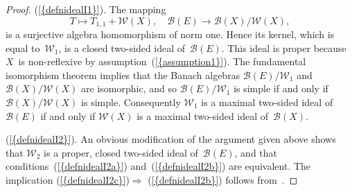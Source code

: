 \documentclass[12pt]{amsart}
\theoremstyle{definition}
\numberwithin{equation}{section}
\begin{document}
\begin{proof} 
  {{\normalfont\textrm{(\ref{{defnidealI1}})}}}.  The mapping
  \[ T\mapsto T_{1,1} + \mathscr{W}(X),\quad
  \mathscr{B}(E)\to\mathscr{B}(X)\big/\mathscr{W}(X), \] is a
  surjective algebra homomorphism of norm one. Hence its kernel, which
  is equal to~$\mathscr{W}_1$, is a closed two-sided ideal
  of~$\mathscr{B}(E)$. This ideal is proper because $X$~is
  non-reflexive by assumption~{{\normalfont\textrm{(\ref{{assumption1}})}}}. The fundamental
  isomorphism theorem implies that the Banach algebras
  $\mathscr{B}(E)\big/\mathscr{W}_1$
  and~$\mathscr{B}(X)\big/\mathscr{W}(X)$ are isomorphic, and so
  $\mathscr{B}(E)\big/\mathscr{W}_1$ is simple if and only if
  $\mathscr{B}(X)\big/\mathscr{W}(X)$ is simple. Consequently
  $\mathscr{W}_1$ is a maximal two-sided ideal of $\mathscr{B}(E)$ if
  and only if $\mathscr{W}(X)$ is a maximal two-sided ideal
  of~$\mathscr{B}(X)$.

  {{\normalfont\textrm{(\ref{{defnidealI2}})}}}.  An obvious modification of the argument
  given above shows that $\mathscr{W}_2$ is a proper, closed two-sided
  ideal of~$\mathscr{B}(E)$, and that
  conditions~{{\normalfont\textrm{(\ref{{defnidealI2a}})}}} and~{{\normalfont\textrm{(\ref{{defnidealI2b}})}}} are
  equivalent.  The im\-pli\-ca\-tion
  {{\normalfont\textrm{(\ref{{defnidealI2c}})}}}$\Rightarrow$  {{\normalfont\textrm{(\ref{{defnidealI2b}})}}} follows from~\cite[Proposition~2.f.4]{lt1}.


\end{proof}
\end{document}

